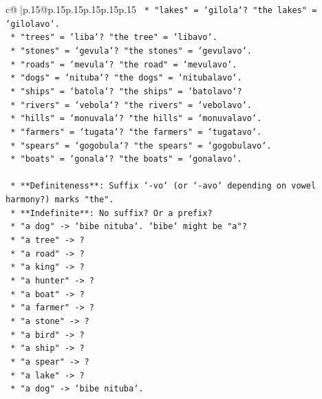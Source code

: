 \documentclass{article}
\begin{document}
{\begin{supertabular}{c@{$\;$}|p{.15\linewidth}@{}p{.15\linewidth}p{.15\linewidth}p{.15\linewidth}p{.15\linewidth}p{.15\linewidth}}
{{{\texttt{        *   "lakes" = `gilola`? "the lakes" = `gilolavo`.} \\
\texttt{        *   "trees" = `liba`? "the tree" = `libavo`.} \\
\texttt{        *   "stones" = `gevula`? "the stones" = `gevulavo`.} \\
\texttt{        *   "roads" = `mevula`? "the road" = `mevulavo`.} \\
\texttt{        *   "dogs" = `nituba`? "the dogs" = `nitubalavo`.} \\
\texttt{        *   "ships" = `batola`? "the ships" = `batolavo`?} \\
\texttt{        *   "rivers" = `vebola`? "the rivers" = `vebolavo`.} \\
\texttt{        *   "hills" = `monuvala`? "the hills" = `monuvalavo`.} \\
\texttt{        *   "farmers" = `tugata`? "the farmers" = `tugatavo`.} \\
\texttt{        *   "spears" = `gogobula`? "the spears" = `gogobulavo`.} \\
\texttt{        *   "boats" = `gonala`? "the boats" = `gonalavo`.} \\
\\ 
\texttt{        *   **Definiteness**: Suffix `{-}vo` (or `{-}avo` depending on vowel harmony?) marks "the".} \\
\texttt{        *   **Indefinite**: No suffix? Or a prefix?} \\
\texttt{        *   "a dog" {-}> `bibe nituba`. `bibe` might be "a"?} \\
\texttt{        *   "a tree" {-}> ?} \\
\texttt{        *   "a road" {-}> ?} \\
\texttt{        *   "a king" {-}> ?} \\
\texttt{        *   "a hunter" {-}> ?} \\
\texttt{        *   "a boat" {-}> ?} \\
\texttt{        *   "a farmer" {-}> ?} \\
\texttt{        *   "a stone" {-}> ?} \\
\texttt{        *   "a bird" {-}> ?} \\
\texttt{        *   "a ship" {-}> ?} \\
\texttt{        *   "a spear" {-}> ?} \\
\texttt{        *   "a lake" {-}> ?} \\
\texttt{        *   "a dog" {-}> `bibe nituba`.} \\
}}}
\end{supertabular}}
\end{document}
